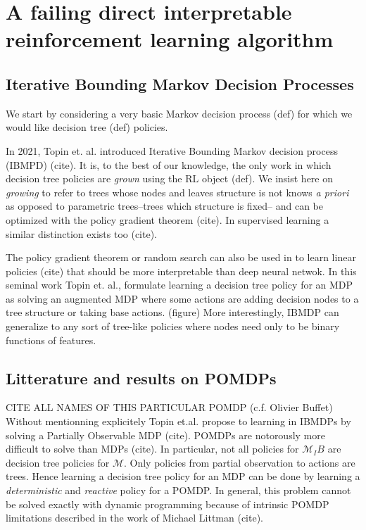\chapter{A failing direct interpretable reinforcement learning algorithm}

\section{Iterative Bounding Markov Decision Processes}
We start by considering a very basic Markov decision process (def) for which we would like decision tree (def) policies. 
 
In 2021, Topin et. al. introduced Iterative Bounding Markov decision process (IBMPD) (cite). It is, to the best of our knowledge, the only work in which decision tree policies are \textit{grown} using the RL object (def).
We insist here on \textit{growing} to refer to trees whose nodes and leaves structure is not knows \textit{a priori} as opposed to parametric trees--trees which structure is fixed-- and can be optimized with the policy gradient theorem (cite).
In supervised learning a similar distinction exists too (cite).

The policy gradient theorem or random search can also be used in to learn linear policies (cite) that should be more interpretable than deep neural netwok. 
In this seminal work Topin et. al., formulate learning a decision tree policy for an MDP as solving an augmented MDP where some actions are adding decision nodes to a tree structure or taking base actions. (figure)
More interestingly, IBMDP can generalize to any sort of tree-like policies where nodes need only to be binary functions of features.  

\section{Litterature and results on POMDPs}
CITE ALL NAMES OF THIS PARTICULAR POMDP (c.f. Olivier Buffet)
Without mentionning explicitely Topin et.al. propose to learning in IBMDPs by solving a Partially Observable MDP (cite). POMDPs are notorously more difficult to solve than MDPs (cite).
In particular, not all policies for $\mathcal{M}_IB$ are decision tree policies for $\mathcal{M}$. Only policies from partial observation to actions are trees. 
Hence learning a decision tree policy for an MDP can be done by learning a \textit{deterministic} and \textit{reactive} policy for a POMDP. 
In general, this problem cannot be solved exactly with dynamic programming because of intrinsic POMDP limitations described in the work of Michael Littman (cite).


